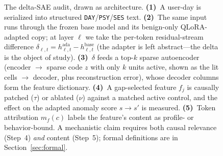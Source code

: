 \begin{figure}[t]
{\begin{tikzpicture}
\end{tikzpicture}}%
\caption{The delta-SAE audit, drawn as architecture.
\textbf{(1)}~A user-day is serialized into structured
\texttt{DAY}/\texttt{PSY}/\texttt{SES} text.
\textbf{(2)}~The same input runs through the frozen base model and its
benign-only QLoRA-adapted copy; at layer $\ell$ we take the per-token
residual-stream difference
$\delta_{\ell,t}=h^{\mathrm{ada}}_{\ell,t}-h^{\mathrm{base}}_{\ell,t}$
(the adapter is left abstract---the delta is the object of study).
\textbf{(3)}~$\delta$ feeds a top-$k$ sparse autoencoder (encoder $\to$ sparse
code $z$ with only $k$ units active, shown as the lit cells $\to$ decoder,
plus reconstruction error), whose decoder columns form the feature dictionary.
\textbf{(4)}~A gap-selected feature $f_j$ is causally patched ($\tau$) or
ablated ($\nu$) against a matched active control, and the effect on the adapted
anomaly score $s\!\to\!s'$ is measured.
\textbf{(5)}~Token attribution $m_f(c)$ labels the feature's content as
profile- or behavior-bound. A mechanistic claim requires both causal relevance
(Step~4) \emph{and} content (Step~5); formal definitions are in
Section~\ref{sec:formal}.}
\label{fig:architecture}
\end{figure}
